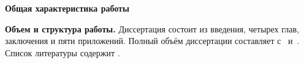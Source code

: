 \textbf{Общая характеристика работы} 
\newcommand{\aim}{\textbf{Целью}}
\newcommand{\scope}{\textbf{Область исследования}}
\newcommand{\subject}{\textbf{Предметом исследования}}
\newcommand{\tasks}{задачи}
\newcommand{\defpositions}{\textbf{Основные положения, выносимые на~защиту:}}
\newcommand{\novelty}{\textbf{Научная новизна:}}
\newcommand{\influence}{\textbf{Практическая значимость}}
\newcommand{\reliability}{\textbf{Степень достоверности}}
\newcommand{\probation}{\textbf{Апробация работы.}}
\newcommand{\contribution}{\textbf{Личный вклад.}}
\newcommand{\publications}{\textbf{Публикации.}}

\textbf{Объем и структура работы.} Диссертация состоит из введения, четырех глав, заключения и пяти приложений. Полный объём диссертации составляет  
с~
и~. Список литературы содержит  
.
\clearpage



